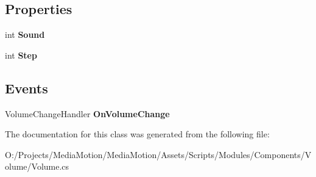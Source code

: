 \subsection*{Properties}
\begin{DoxyCompactItemize}
\item 
\hypertarget{class_media_motion_1_1_modules_1_1_components_1_1_volume_1_1_volume_aa2b04930f2feeda79d381e662389e9e6}{int {\bfseries Sound}}\label{class_media_motion_1_1_modules_1_1_components_1_1_volume_1_1_volume_aa2b04930f2feeda79d381e662389e9e6}

\item 
\hypertarget{class_media_motion_1_1_modules_1_1_components_1_1_volume_1_1_volume_a6553c285b133d2db698b953ad0da978e}{int {\bfseries Step}}\label{class_media_motion_1_1_modules_1_1_components_1_1_volume_1_1_volume_a6553c285b133d2db698b953ad0da978e}

\end{DoxyCompactItemize}
\subsection*{Events}
\begin{DoxyCompactItemize}
\item 
\hypertarget{class_media_motion_1_1_modules_1_1_components_1_1_volume_1_1_volume_a3e93fb0d13bc06da2515736071f458c8}{Volume\+Change\+Handler {\bfseries On\+Volume\+Change}}\label{class_media_motion_1_1_modules_1_1_components_1_1_volume_1_1_volume_a3e93fb0d13bc06da2515736071f458c8}

\end{DoxyCompactItemize}


The documentation for this class was generated from the following file\+:\begin{DoxyCompactItemize}
\item 
O\+:/\+Projects/\+Media\+Motion/\+Media\+Motion/\+Assets/\+Scripts/\+Modules/\+Components/\+Volume/Volume.\+cs\end{DoxyCompactItemize}
